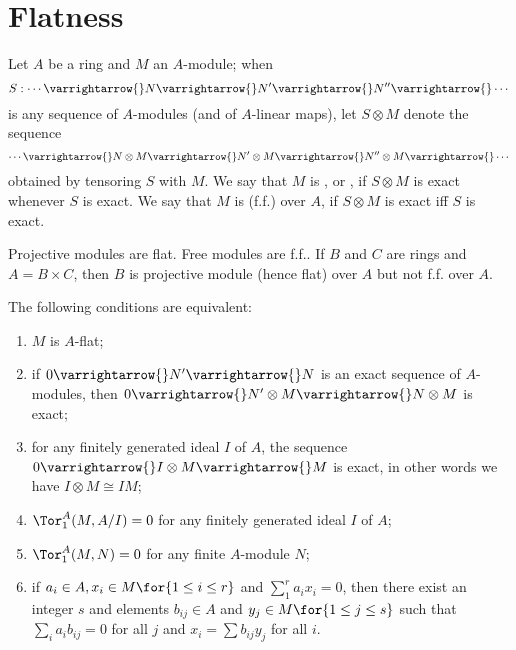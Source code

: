 \documentclass[../main]{subfiles}
\begin{document}
\section{Flatness}\label{sec:03}

\begin{pardefinition}
    Let $A$ be a ring and $M$ an $A$-module; when \[S:\cdots \varrightarrow{} N \varrightarrow{} N' \varrightarrow{} N'' \varrightarrow{} \cdots\] is any sequence of $A$-modules (and of $A$-linear maps), let $S \otimes M$ denote the sequence \[\cdots \varrightarrow{} N \otimes M \varrightarrow{} N' \otimes M \varrightarrow{} N'' \otimes M \varrightarrow{} \cdots\] obtained by tensoring $S$ with $M$. We say that $M$ is , or , if $S\otimes M$ is exact whenever $S$ is exact. We say that $M$ is  (f.f.) over $A$, if $S\otimes M$ is exact iff $S$ is exact.     
\end{pardefinition}

\begin{example} 
    Projective modules are flat. Free modules are f.f.. If $B$ and $C$ are rings and $A = B \times C$, then $B$ is projective module (hence flat) over $A$ but not f.f. over $A$.
\end{example}

\begin{theorem}\label{thm:001}
    The following conditions are equivalent:
    \begin{enumerate} [label={(\arabic*)}]
       \item $M$ is $A$-flat;
       \item if $0 \varrightarrow{} N' \varrightarrow{} N$ is an exact sequence of $A$-modules, then \newline $0 \varrightarrow{} N' \otimes M \varrightarrow{} N \otimes M$ is exact;
       \item for any finitely generated ideal $I$ of $A$, the sequence $0 \varrightarrow{} I\otimes M \varrightarrow{} M$ is exact, in other words we have $I \otimes M \cong IM$;
       \item $\Tor^A_1 (M, A/ I) = 0$ for any finitely generated ideal $I$ of $A$;
       \item $\Tor^A_1(M,N) = 0$ for any finite $A$-module $N$;
       \item if $a_i \in A, x_i \in M\for{1 \leq i \leq r}$ and $\sum_1^r a_i x_i = 0$, then there exist an integer $s$ and elements $b_{ij} \in A$ and $y_j \in M\for{1 \leq j \leq s}$ such that $\sum_i a_i b_{ij} = 0$ for all $j$ and $x_i = \sum b_{ij}y_j$ for all $i$.
    \end{enumerate}
\end{theorem}
\end{document}
